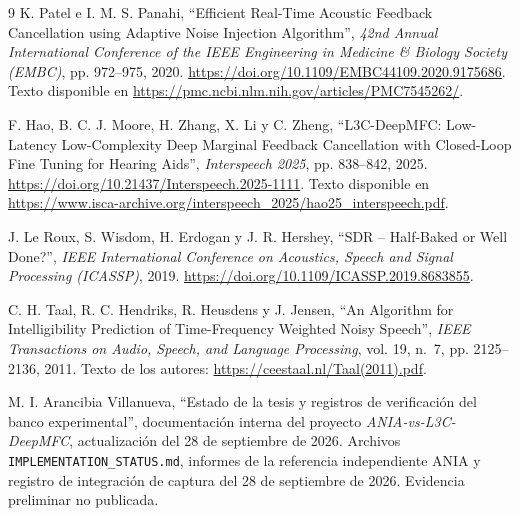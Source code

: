\renewcommand{\refname}{Bibliografía}
\begin{thebibliography}{9}
K. Patel e I. M. S. Panahi, ``Efficient Real-Time Acoustic Feedback Cancellation using Adaptive Noise Injection Algorithm'', \textit{42nd Annual International Conference of the IEEE Engineering in Medicine \& Biology Society (EMBC)}, pp. 972--975, 2020.
\url{https://doi.org/10.1109/EMBC44109.2020.9175686}.
Texto disponible en \url{https://pmc.ncbi.nlm.nih.gov/articles/PMC7545262/}.

F. Hao, B. C. J. Moore, H. Zhang, X. Li y C. Zheng, ``L3C-DeepMFC: Low-Latency Low-Complexity Deep Marginal Feedback Cancellation with Closed-Loop Fine Tuning for Hearing Aids'', \textit{Interspeech 2025}, pp. 838--842, 2025.
\url{https://doi.org/10.21437/Interspeech.2025-1111}.
Texto disponible en \url{https://www.isca-archive.org/interspeech_2025/hao25_interspeech.pdf}.

J. Le Roux, S. Wisdom, H. Erdogan y J. R. Hershey, ``SDR -- Half-Baked or Well Done?'', \textit{IEEE International Conference on Acoustics, Speech and Signal Processing (ICASSP)}, 2019.
\url{https://doi.org/10.1109/ICASSP.2019.8683855}.

C. H. Taal, R. C. Hendriks, R. Heusdens y J. Jensen, ``An Algorithm for Intelligibility Prediction of Time-Frequency Weighted Noisy Speech'', \textit{IEEE Transactions on Audio, Speech, and Language Processing}, vol. 19, n.\ 7, pp. 2125--2136, 2011.
Texto de los autores: \url{https://ceestaal.nl/Taal(2011).pdf}.

M. I. Arancibia Villanueva, ``Estado de la tesis y registros de verificación del banco experimental'', documentación interna del proyecto \textit{ANIA-vs-L3C-DeepMFC}, actualización del 28 de septiembre de 2026. Archivos \texttt{IMPLEMENTATION\_STATUS.md}, informes de la referencia independiente ANIA y registro de integración de captura del 28 de septiembre de 2026. Evidencia preliminar no publicada.
\end{thebibliography}
